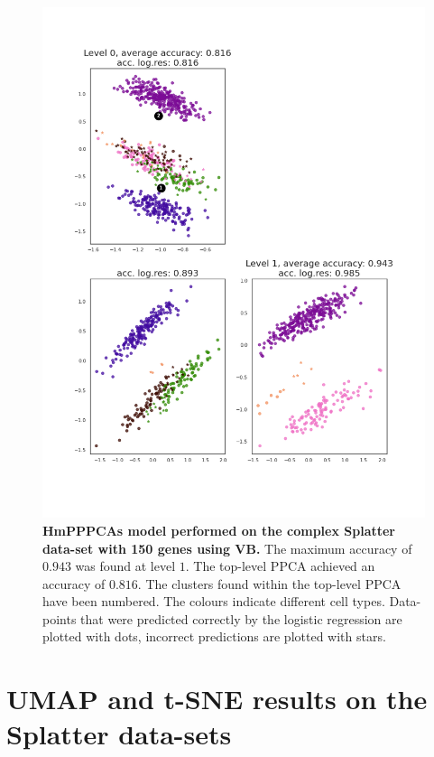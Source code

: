 \begin{figure}
    \centering
    \includegraphics[width=\linewidth]{figs/complex_150_vb.png}
    \caption[HmPPPCAs model performed on the complex Splatter data-set with 150 genes using VB]{\small \textbf{HmPPPCAs model performed on the complex Splatter data-set with 150 genes using VB.} \small The maximum accuracy of $0.943$ was found at level $1$. The top-level PPCA achieved an accuracy of $0.816$. The clusters found within the top-level PPCA have been numbered. The colours indicate different cell types. Data-points that were predicted correctly by the logistic regression are plotted with dots, incorrect predictions are plotted with stars.}
    \label{fig:complex_150_vb}
\end{figure}

\clearpage

\section{UMAP and t-SNE results on the Splatter data-sets}\label{sec:baselineresults}


